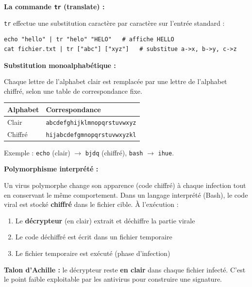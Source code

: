 \documentclass[a4paper,11pt]{article}
\theoremstyle{plain}
\theoremstyle{definition}
\begin{document}
\begin{rappel}
\textbf{La commande \texttt{tr} (translate) :}

\texttt{tr} effectue une substitution caractère par caractère sur l'entrée standard :
\begin{lstlisting}[numbers=none]
echo "hello" | tr "helo" "HELO"   # affiche HELLO
cat fichier.txt | tr ["abc"] ["xyz"]   # substitue a->x, b->y, c->z
\end{lstlisting}

\medskip
\textbf{Substitution monoalphabétique :}

Chaque lettre de l'alphabet clair est remplacée par une lettre de l'alphabet chiffré, selon une table de correspondance fixe.

\begin{center}
\begin{tabular}{ll}
\toprule
\textbf{Alphabet} & \textbf{Correspondance} \\
\midrule
Clair   & \texttt{abcdefghijklmnopqrstuvwxyz} \\
Chiffré & \texttt{hijabcdefgmnopqrstuvwxyzkl} \\
\bottomrule
\end{tabular}
\end{center}

Exemple : \texttt{echo} (clair) $\rightarrow$ \texttt{bjdq} (chiffré), \texttt{bash} $\rightarrow$ \texttt{ihue}.

\medskip
\textbf{Polymorphisme interprété :}

Un virus polymorphe change son apparence (code chiffré) à chaque infection tout en conservant le même comportement. Dans un langage interprété (Bash), le code viral est stocké \textbf{chiffré} dans le fichier cible. À l'exécution :
\begin{enumerate}
    \item Le \textbf{décrypteur} (en clair) extrait et déchiffre la partie virale
    \item Le code déchiffré est écrit dans un fichier temporaire
    \item Le fichier temporaire est exécuté (phase d'infection)
\end{enumerate}

\medskip
\textbf{Talon d'Achille :} le décrypteur reste \textbf{en clair} dans chaque fichier infecté. C'est le point faible exploitable par les antivirus pour construire une signature.
\end{rappel}
\end{document}
